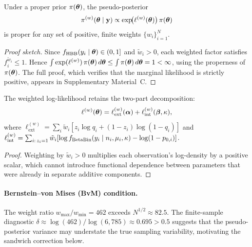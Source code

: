 \begin{theorem}\label{thm:propriety}
  Under a proper prior $\pi(\boldsymbol{\theta})$, the pseudo-posterior
  \begin{equation}\label{eq:pseudo-posterior}
    \pi^{(w)}(\boldsymbol{\theta} \mid \mathbf{y})
    \propto \exp\!\bigl(\ell^{(w)}(\boldsymbol{\theta})\bigr)\,\pi(\boldsymbol{\theta})
  \end{equation}
  is proper for any set of positive, finite weights $\{w_i\}_{i=1}^N$.
\end{theorem}

\begin{proof}[Proof sketch]
  Since $f_{\operatorname{HBB}}(y_i \mid \boldsymbol{\theta}) \in (0,1]$ and $\tilde{w}_i > 0$,
  each weighted factor satisfies $f_i^{\tilde{w}_i} \le 1$. Hence
  $\int \exp(\ell^{(w)})\,\pi(\boldsymbol{\theta})\,d\boldsymbol{\theta}
  \le \int \pi(\boldsymbol{\theta})\,d\boldsymbol{\theta} = 1 < \infty$, using
  the properness of $\pi(\boldsymbol{\theta})$. The full proof, which verifies that the
  marginal likelihood is strictly positive, appears in Supplementary
  Material~C.
\end{proof}

\begin{proposition}\label{prop:weighted-sep}
  The weighted log-likelihood retains the two-part decomposition:
  \begin{equation}\label{eq:weighted-sep}
    \ell^{(w)}(\boldsymbol{\theta})
    = \ell_{\mathrm{ext}}^{(w)}(\boldsymbol{\alpha})
    + \ell_{\mathrm{int}}^{(w)}(\boldsymbol{\beta}, \kappa),
  \end{equation}
  where
  $\ell_{\mathrm{ext}}^{(w)} = \sum_i \tilde{w}_i[z_i\log q_i + (1-z_i)\log(1-q_i)]$
  and
  $\ell_{\mathrm{int}}^{(w)} = \sum_{i:\,z_i=1}
  \tilde{w}_i[\log f_{\operatorname{BetaBin}}(y_i \mid n_i,\mu_i,\kappa) - \log(1-p_{0,i})]$.
\end{proposition}

\begin{proof}
  Weighting by $\tilde{w}_i > 0$ multiplies each observation's log-density
  by a positive scalar, which cannot introduce functional dependence between
  parameters that were already in separate additive components.
\end{proof}

\paragraph{Bernstein--von Mises (BvM) condition.}
The weight ratio $w_{\max}/w_{\min} = 462$ exceeds $N^{1/2} \approx 82.5$.
The finite-sample diagnostic
$\delta \approx \log(462)/\log(6{,}785) \approx 0.695 > 0.5$ suggests that
the pseudo-posterior variance may understate the true sampling variability,
motivating the sandwich correction below.

